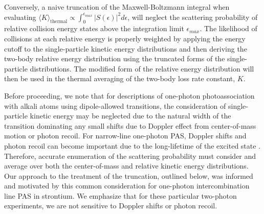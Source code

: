 Conversely, a naive truncation of the Maxwell-Boltzmann integral when evaluating $\langle K \rangle_\text{thermal} \propto \displaystyle \int_0^{\epsilon_{max}} \vert S(\epsilon) \vert^2 d\epsilon$, will neglect the scattering probability of relative collision energy states above the integration limit $\epsilon_{max}$.
The likelihood of collisions at each relative energy is properly weighted by applying the energy cutoff to the single-particle kinetic energy distributions and then deriving the two-body relative energy distribution using the truncated forms of the single-particle distributions.
The modified form of the relative energy distribution will then be used in the thermal averaging of the two-body loss rate constant, $K$.

Before proceeding, we note that for descriptions of one-photon photoassociation with alkali atoms using dipole-allowed transitions, the consideration of single-particle kinetic energy may be neglected due to the natural width of the transition dominating any small shifts due to Doppler effect from center-of-mass motion or photon recoil.
For narrow-line one-photon PAS, Doppler shifts and photon recoil can become important due to the long-lifetime of the excited state \cite{Ciuryo2004, Borkowski2014a, Nicholson2015a, Reschovsky2018, Pachomov2017}.
Therefore, accurate enumeration of the scattering probability must consider and average over both the center-of-mass and relative kinetic energy distributions.
Our approach to the treatment of the truncation, outlined below, was informed and motivated by this common consideration for one-photon intercombination line PAS in strontium.
We emphasize that for these particular two-photon experiments, we are not sensitive to Doppler shifts or photon recoil.
%



